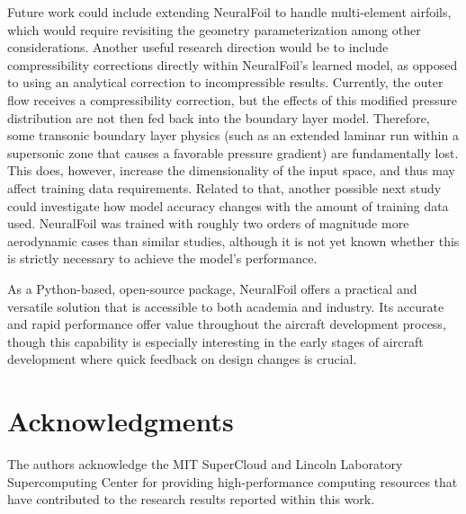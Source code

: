 \documentclass[journal]{new-aiaa}
\begin{document}
Future work could include extending NeuralFoil to handle multi-element airfoils, which would require revisiting the geometry parameterization among other considerations. Another useful research direction would be to include compressibility corrections directly within NeuralFoil's learned model, as opposed to using an analytical correction to incompressible results. Currently, the outer flow receives a compressibility correction, but the effects of this modified pressure distribution are not then fed back into the boundary layer model. Therefore, some transonic boundary layer physics (such as an extended laminar run within a supersonic zone that causes a favorable pressure gradient) are fundamentally lost. This does, however, increase the dimensionality of the input space, and thus may affect training data requirements. Related to that, another possible next study could investigate how model accuracy changes with the amount of training data used. NeuralFoil was trained with roughly two orders of magnitude more aerodynamic cases than similar studies, although it is not yet known whether this is strictly necessary to achieve the model's performance.

As a Python-based, open-source package, NeuralFoil offers a practical and versatile solution that is accessible to both academia and industry. Its accurate and rapid performance offer value throughout the aircraft development process, though this capability is especially interesting in the early stages of aircraft development where quick feedback on design changes is crucial.

\section*{Acknowledgments}
The authors acknowledge the MIT SuperCloud and Lincoln Laboratory Supercomputing Center for providing high-performance computing resources that have contributed to the research results reported within this work.


\end{document}
